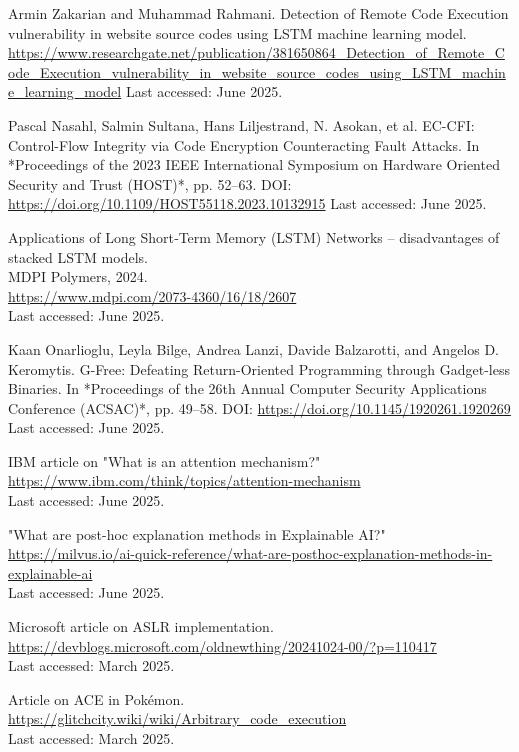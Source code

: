 \documentclass[a4paper]{usiinfbachelorproject}
\begin{document}
\begin{thebibliography}{99}
	Armin Zakarian and Muhammad Rahmani.
	Detection of Remote Code Execution vulnerability in website source codes using LSTM machine learning model.
	\url{https://www.researchgate.net/publication/381650864_Detection_of_Remote_Code_Execution_vulnerability_in_website_source_codes_using_LSTM_machine_learning_model}
	Last accessed: June 2025.

	Pascal Nasahl, Salmin Sultana, Hans Liljestrand, N. Asokan, et al.
	EC-CFI: Control-Flow Integrity via Code Encryption Counteracting Fault Attacks.
	In *Proceedings of the 2023 IEEE International Symposium on Hardware Oriented Security and Trust (HOST)*, pp. 52–63.
	DOI: \url{https://doi.org/10.1109/HOST55118.2023.10132915}
	Last accessed: June 2025.



	Applications of Long Short‑Term Memory (LSTM) Networks – disadvantages of stacked LSTM models.  \\
	MDPI Polymers, 2024.  \\
	\url{https://www.mdpi.com/2073-4360/16/18/2607}  \\
	Last accessed: June 2025.

	Kaan Onarlioglu, Leyla Bilge, Andrea Lanzi, Davide Balzarotti, and Angelos D. Keromytis.
	G-Free: Defeating Return-Oriented Programming through Gadget-less Binaries.
	In *Proceedings of the 26th Annual Computer Security Applications Conference (ACSAC)*, pp. 49–58.
	DOI: \url{https://doi.org/10.1145/1920261.1920269}
	Last accessed: June 2025.

	IBM article on "What is an attention mechanism?"\\
	\url{https://www.ibm.com/think/topics/attention-mechanism}\\
	Last accessed: June 2025.

	"What are post-hoc explanation methods in Explainable AI?"\\
	\url{https://milvus.io/ai-quick-reference/what-are-posthoc-explanation-methods-in-explainable-ai}\\
	Last accessed: June 2025.

	Microsoft article on ASLR implementation.\\
	\url{https://devblogs.microsoft.com/oldnewthing/20241024-00/?p=110417}\\
	Last accessed: March 2025.

	Article on ACE in Pokémon.\\
	\url{https://glitchcity.wiki/wiki/Arbitrary_code_execution}\\
	Last accessed: March 2025.



\end{thebibliography}
\end{document}
